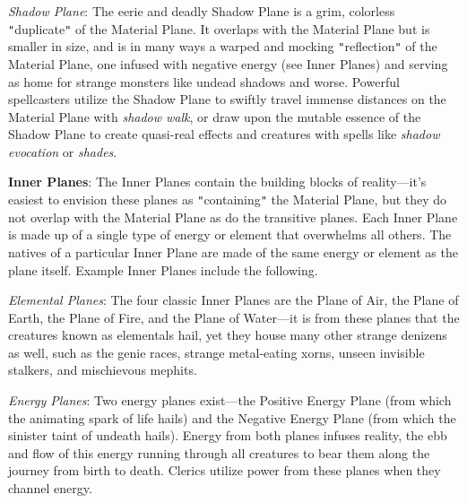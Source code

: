 \textit{Shadow Plane}: The eerie and deadly Shadow Plane is a grim, colorless \texttt{{}"{}}duplicate\texttt{{}"{}} of the Material Plane. It overlaps with the Material Plane but is smaller in size, and is in many ways a warped and mocking \texttt{{}"{}}reflection\texttt{{}"{}} of the Material Plane, one infused with negative energy (see Inner Planes) and serving as home for strange monsters like undead shadows and worse. Powerful spellcasters utilize the Shadow Plane to swiftly travel immense distances on the Material Plane with \textit{shadow walk}, or draw upon the mutable essence of the Shadow Plane to create quasi-real effects and creatures with spells like \textit{shadow evocation} or \textit{shades}.
				
\textbf{Inner Planes}: The Inner Planes contain the building blocks of reality---it's easiest to envision these planes as \texttt{{}"{}}containing\texttt{{}"{}} the Material Plane, but they do not overlap with the Material Plane as do the transitive planes. Each Inner Plane is made up of a single type of energy or element that overwhelms all others. The natives of a particular Inner Plane are made of the same energy or element as the plane itself. Example Inner Planes include the following.
				
\textit{Elemental Planes}: The four classic Inner Planes are the Plane of Air, the Plane of Earth, the Plane of Fire, and the Plane of Water---it is from these planes that the creatures known as elementals hail, yet they house many other strange denizens as well, such as the genie races, strange metal-eating xorns, unseen invisible stalkers, and mischievous mephits.
				
\textit{Energy Planes}: Two energy planes exist---the Positive Energy Plane (from which the animating spark of life hails) and the Negative Energy Plane (from which the sinister taint of undeath hails). Energy from both planes infuses reality, the ebb and flow of this energy running through all creatures to bear them along the journey from birth to death. Clerics utilize power from these planes when they channel energy.
				
